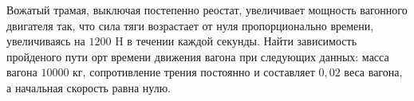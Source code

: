 Вожатый трамая, выключая постепенно реостат, увеличивает мощность
вагонного двигателя так, что сила тяги возрастает от нуля пропорционально
времени, увеличиваясь на $1200$ H в течении каждой секунды. Найти 
зависимость пройденого пути орт времени движения вагона при следующих 
данных: масса вагона $10 000 $ кг, сопротивление трения постоянно и 
составляет $0,02$ веса вагона, а начальная скорость равна нулю.

